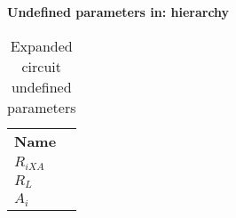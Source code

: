 {\textbf{Undefined parameters in: hierarchy}}

\begin{table}[H]
\centering
\begin{tabular}[c]{l}
\textbf{Name} \\ 
\rowcolor{myyellow}
$R_{i XA}$ \\ 
$R_{L}$ \\ 
\rowcolor{myyellow}
$A_{i}$ \\ 
\end{tabular}
\caption{Expanded circuit undefined parameters}
\end{table}

